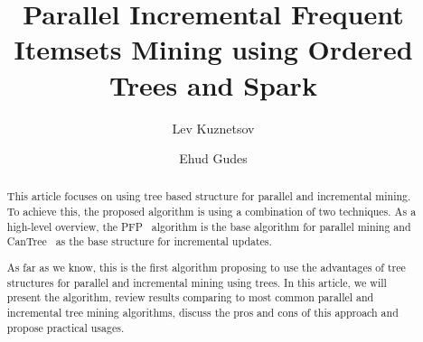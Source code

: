\documentclass[sigconf, nonacm]{acmart}
\begin{document}
\title{Parallel Incremental Frequent Itemsets Mining using Ordered Trees and Spark}

\author{Lev Kuznetsov}

\author{Ehud Gudes}

%
%
%

\begin{abstract}
This article focuses on using tree based structure for parallel and incremental mining. To achieve this, the proposed algorithm is using a combination of two techniques. As a high-level overview, the PFP~\cite{li2008pfp} algorithm is the base algorithm for parallel mining and CanTree~\cite{leung2005cantree} as the base structure for incremental updates.

As far as we know, this is the first algorithm proposing to use the advantages of tree structures for parallel and incremental mining using trees. In this article, we will present the algorithm, review results comparing to most common parallel and incremental tree mining algorithms, discuss the pros and cons of this approach and propose practical usages.
\end{abstract}
\end{document}
